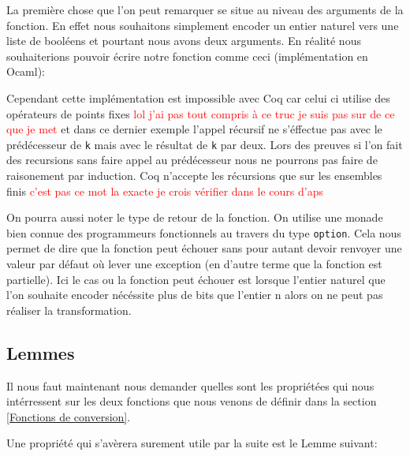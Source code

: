 \documentclass {article}
\newcommand{\codefrom}[3]
           {}
\newcommand{\codefromOcaml}[3]
           {}
\theoremstyle{definition}
\theoremstyle{remark}
\newcommand{\todo}[1]{\textcolor{red}{#1}}
\newcommand{\fun}[1]{\lstinline!#1!}
\begin{document}
La première chose que l'on peut remarquer se situe au niveau des arguments de
la fonction. En effet nous souhaitons simplement encoder un entier naturel vers
une liste de booléens et pourtant nous avons deux arguments.
En réalité nous souhaiterions pouvoir écrire notre fonction comme ceci
(implémentation en Ocaml):
\codefromOcaml{rapport}{example}{nbit}

Cependant cette implémentation est impossible avec Coq car celui ci utilise
des opérateurs de points fixes \todo{lol j'ai pas tout compris à ce truc je suis
  pas sur de ce que je met} et dans ce dernier exemple l'appel récursif ne s'éffectue
pas avec le prédécesseur de \fun{k}  mais avec le
résultat de \fun{k} par deux. Lors des preuves si l'on fait des recursions sans faire appel
au prédécesseur nous ne pourrons pas faire de raisonement par induction. Coq n'accepte les
récursions que sur les ensembles finis \todo{c'est pas ce mot la exacte je crois vérifier dans le cours d'aps}



On pourra aussi noter le type de retour de la fonction.
On utilise une monade bien connue des programmeurs fonctionnels au travers du type
\fun{option}. Cela nous permet de
dire que la fonction peut échouer sans pour autant devoir renvoyer une valeur par
défaut où lever une exception (en d'autre terme que la fonction est partielle). Ici le cas ou la fonction peut échouer est lorsque
l'entier naturel que l'on souhaite encoder nécéssite plus de bits que l'entier n alors
on ne peut pas réaliser la transformation.





\subsection{Lemmes}

Il nous faut maintenant nous demander quelles sont les propriétées qui nous intérressent sur
les deux fonctions que nous venons de définir dans la section \ref{Fonctions de conversion}.

Une propriété qui s'avèrera surement utile par la suite est le Lemme suivant:

\codefrom{src}{binary}{size_n_bit}
\end{document}

